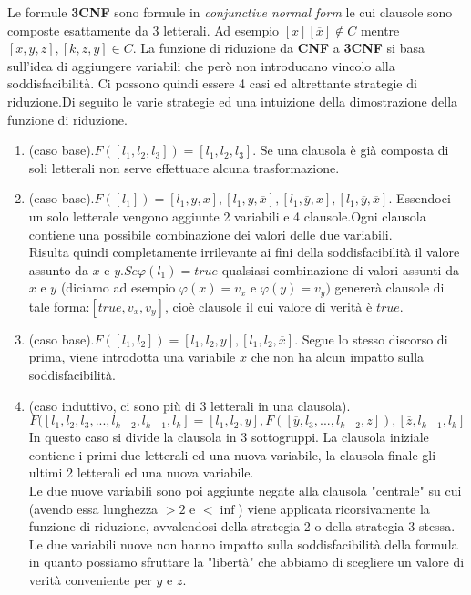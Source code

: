 \documentclass[a4paper]{article}
\begin{document}
Le formule \textbf{3CNF} sono formule in \textit{conjunctive normal form} le cui clausole sono composte esattamente da 3 letterali.
Ad esempio $[x][\overline x] \notin C$ mentre $[x,y,z],[k,\overline z, y] \in C$.
La funzione di riduzione da \textbf{CNF} a \textbf{3CNF} si basa sull'idea di aggiungere variabili che però non introducano vincolo alla soddisfacibilità.
Ci possono quindi essere 4 casi ed altrettante strategie di riduzione.Di seguito le varie strategie ed una intuizione della dimostrazione della funzione di riduzione.
\begin{enumerate}
	\item (caso base).$F([l_1,l_2,l_3]) = [l_1, l_2, l_3]$.
		Se una clausola è già composta di soli letterali non serve effettuare alcuna trasformazione.
	\item (caso base).$F([l_1])=[l_1,y,x],[l_1,y,\overline x],[l_1,\overline y,x],[l_1,\overline y,\overline x]$.
		Essendoci un solo letterale vengono aggiunte 2 variabili e 4 clausole.Ogni clausola contiene una possibile combinazione dei valori delle due variabili.\\
		Risulta quindi completamente irrilevante ai fini della soddisfacibilità il valore assunto da $x$ e $y$.$Se \varphi(l_1)=true$ qualsiasi combinazione di valori assunti da $x$ e $y$ (diciamo ad esempio $\varphi(x)=v_x$ e $\varphi(y)=v_y)$ genererà clausole di tale forma:$[true,v_x,v_y]$, cioè clausole il cui valore di verità è $true$.
	\item (caso base).$F([l_1,l_2])=[l_1,l_2,y],[l_1,l_2,\overline x]$. Segue lo stesso discorso di prima, viene introdotta una variabile $x$ che non ha alcun impatto sulla soddisfacibilità.
	\item (caso induttivo, ci sono più di 3 letterali in una clausola).
		$$F([l_1,l_2, l_3, ... ,l_{k-2}, l_{k-1}, l_k]=[l_1,l_2,y], F([\overline y, l_3, ... ,l_{k-2},z]) , [\overline z,l_{k-1},l_k]$$
		In questo caso si divide la clausola in 3 sottogruppi. La clausola iniziale contiene i primi due letterali ed una nuova variabile, la clausola finale gli ultimi 2 letterali ed una nuova variabile.\\
		Le due nuove variabili sono poi aggiunte negate alla clausola "centrale" su cui (avendo essa lunghezza $>2$ e $< \inf$) viene applicata ricorsivamente la funzione di riduzione, avvalendosi della strategia 2 o della strategia 3 stessa.
		Le due variabili nuove non hanno impatto sulla soddisfacibilità della formula in quanto possiamo sfruttare la "libertà" che abbiamo di scegliere un valore di verità conveniente per $y$ e $z$.\\

\end{enumerate}
\end{document}
